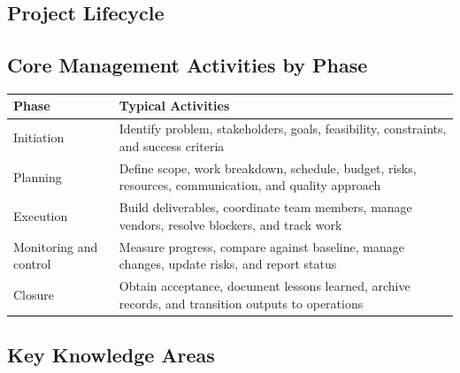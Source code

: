 \documentclass[11pt,a4paper]{article}
\begin{document}
\subsection{Project Lifecycle}

\begin{center}
\end{center}

\subsection{Core Management Activities by Phase}

\begin{longtable}{p{2.7cm}p{8.8cm}}
\toprule
\textbf{Phase} & \textbf{Typical Activities} \\
\midrule
Initiation & Identify problem, stakeholders, goals, feasibility, constraints, and success criteria \\
Planning & Define scope, work breakdown, schedule, budget, risks, resources, communication, and quality approach \\
Execution & Build deliverables, coordinate team members, manage vendors, resolve blockers, and track work \\
Monitoring and control & Measure progress, compare against baseline, manage changes, update risks, and report status \\
Closure & Obtain acceptance, document lessons learned, archive records, and transition outputs to operations \\
\bottomrule
\end{longtable}

\subsection{Key Knowledge Areas}
\end{document}
